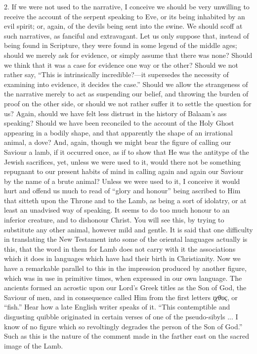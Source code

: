 2. If we were not used to the narrative, I conceive we should be
very unwilling to receive the account of the serpent speaking to Eve,
or its being inhabited by an evil spirit; or, again, of the
devils being sent into the swine. We should scoff at such narratives,
as fanciful and extravagant. Let us only suppose that, instead of
being found in Scripture, they were found in some legend of the middle
ages; should we merely ask for evidence, or simply assume that there
was none? Should we think that it was a case for evidence one way or
the other? Should we not rather say, ``This is intrinsically
incredible?—it supersedes the necessity of examining into evidence,
it decides the case.'' Should we allow the strangeness of the
narrative merely to act as suspending our belief, and throwing the
burden of proof on the other side, or should we not rather suffer it
to settle the question for us? Again, should we have felt less
distrust in the history of Balaam's ass speaking? Should we have been
reconciled to the account of the Holy Ghost appearing in a bodily
shape, and that apparently the shape of an irrational animal, a dove?
And, again, though we might bear the figure of calling our Saviour a
lamb, if it occurred once, as if to show that He was the antitype of
the Jewish sacrifices, yet, unless we were used to it, would there not
be something repugnant to our present habits of mind in calling again
and again our Saviour by the name of a brute animal? Unless we were
used to it, I conceive it would hurt and offend us much to read of
``glory and honour'' being ascribed to Him that sitteth upon
the Throne and to the Lamb, as being a sort of idolatry, or at least
an unadvised way of speaking. It seems to do too much honour to an
inferior creature, and to dishonour Christ. You will see this, by
trying to substitute any other animal, however mild and gentle. It is
said that one difficulty in translating the New Testament into some of
the oriental languages actually is this, that the word in them for
Lamb does not carry with it the associations which it does in
languages which have had their birth in Christianity. Now we have a
remarkable parallel to this in the impression produced by another
figure, which was in use in primitive times, when expressed in our own
language. The ancients formed an acrostic upon our Lord's Greek titles
as the Son of God, the Saviour of men, and in consequence called Him
from the first letters \emph{ιχθυς},
or ``fish.'' Hear how a late English writer speaks of it.
``This contemptible and disgusting quibble originated in certain
verses of one of the pseudo-sibyls ... I know of no figure which so
revoltingly degrades the person of the Son of God.'' Such as this
is the nature of the comment made in the farther east on the sacred
image of the Lamb.

